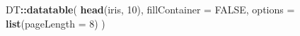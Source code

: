 \documentclass[ignorenonframetext,]{beamer}
\newenvironment{Shaded}{\begin{snugshade}}{\end{snugshade}}
\newcommand{\DataTypeTok}[1]{\textcolor[rgb]{0.13,0.29,0.53}{#1}}
\newcommand{\DecValTok}[1]{\textcolor[rgb]{0.00,0.00,0.81}{#1}}
\newcommand{\FloatTok}[1]{\textcolor[rgb]{0.00,0.00,0.81}{#1}}
\newcommand{\KeywordTok}[1]{\textcolor[rgb]{0.13,0.29,0.53}{\textbf{#1}}}
\newcommand{\NormalTok}[1]{#1}
\newcommand{\OperatorTok}[1]{\textcolor[rgb]{0.81,0.36,0.00}{\textbf{#1}}}
\newcommand{\OtherTok}[1]{\textcolor[rgb]{0.56,0.35,0.01}{#1}}
\newcommand{\StringTok}[1]{\textcolor[rgb]{0.31,0.60,0.02}{#1}}
\begin{document}
\begin{frame}[fragile]

\begin{Shaded}
\end{Shaded}

\end{frame}

\begin{frame}[fragile]

\begin{Shaded}
\begin{Highlighting}[]
\NormalTok{DT}\OperatorTok{::}\KeywordTok{datatable}\NormalTok{(}
  \KeywordTok{head}\NormalTok{(iris, }\DecValTok{10}\NormalTok{),}
  \DataTypeTok{fillContainer =} \OtherTok{FALSE}\NormalTok{, }\DataTypeTok{options =} \KeywordTok{list}\NormalTok{(}\DataTypeTok{pageLength =} \DecValTok{8}\NormalTok{)}
\NormalTok{)}
\end{Highlighting}
\end{Shaded}

\end{frame}
\end{document}
